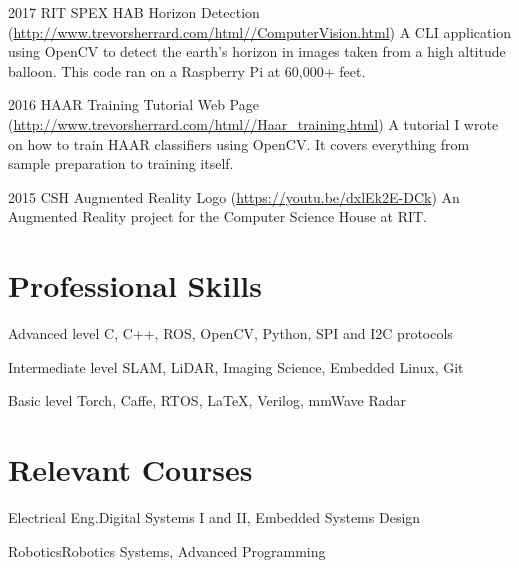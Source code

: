 \documentclass{tccv}
\begin{document}
\begin{yearlist}

\item{2017}
     {RIT SPEX HAB Horizon Detection (\href{http://www.trevorsherrard.com/html/ComputerVision.html}{http://www.trevorsherrard.com/html/\newline/ComputerVision.html})}
     {A CLI application using OpenCV to detect the earth's horizon in images taken from a high altitude balloon. This code ran on a Raspberry Pi at 60,000+ feet.}

\item{2016}
     {HAAR Training Tutorial Web Page (\href{http://www.trevorsherrard.com/html/Haar_training.html}{http://www.trevorsherrard.com/html/\newline/Haar\_training.html})}
     {A tutorial I wrote on how to train HAAR classifiers using OpenCV. It covers everything from sample preparation to training itself.}
     
\item{2015}
     {CSH Augmented Reality Logo (\href{https://youtu.be/dxlEk2E-DCk}{https://youtu.be/dxlEk2E-DCk})}
     {An Augmented Reality project for the Computer Science House at RIT.}

\end{yearlist}


\section{Professional Skills}
\begin{factlist}

\item{Advanced  level}
     {C, C++, ROS, OpenCV, Python, SPI and I2C protocols}

\item{Intermediate level}
     {SLAM, LiDAR, Imaging Science, Embedded Linux, Git}

\item{Basic level}
     {Torch, Caffe, RTOS, \LaTeX, Verilog, mmWave Radar}

\end{factlist}

\section{Relevant Courses}
\begin{factlist}

\item{Electrical Eng.}{Digital Systems I and II, Embedded Systems Design}

\item{Robotics}{Robotics Systems, Advanced Programming}

\end{factlist}
\end{document}
